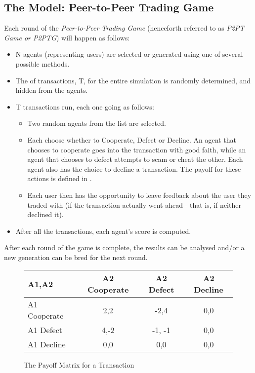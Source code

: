 \documentclass{article}
\begin{document}
\subsection{The Model: Peer-to-Peer Trading Game}
\label{sec:P2PTG}
Each round of the \emph{Peer-to-Peer Trading Game} (henceforth referred to as \emph{P2PT Game or P2PTG}) will happen as follows:
\begin{itemize}
	\item N agents (representing users) are selected or generated using one of several possible methods.
	\item The of transactions, T, for the entire simulation is randomly determined, and hidden from the agents.
	\item T transactions run, each one going as follows:
	\begin{itemize}
		\item Two random agents from the list are selected.
		\item Each choose whether to Cooperate, Defect or Decline. An agent that chooses to cooperate goes into the transaction with good faith, while an agent that chooses to defect attempts to scam or cheat the other. Each agent also has the choice to decline a transaction. The payoff for these actions is defined in .
		\item Each user then has the opportunity to leave feedback about the user they traded with (if the transaction actually went ahead - that is, if neither declined it).
	\end{itemize}
	\item After all the transactions, each agent's score is computed.
\end{itemize}

After each round of the game is complete, the results can be analysed and/or a new generation can be bred for the next round.
\begin{figure}[h]
	\begin{center}
		\label{fig:model-payoff}
		\caption{The Payoff Matrix for a Transaction}
		\begin{tabular}{| l || c | c | c |}
			\hline
			A1,A2 & A2 Cooperate & A2 Defect & A2 Decline \\ \hline
			A1 Cooperate & 2,2 & -2,4 & 0,0 \\ \hline  
			A1 Defect & 4,-2 & -1, -1 & 0,0 \\ \hline
			A1 Decline & 0,0 & 0,0 & 0,0 \\ \hline
		\end{tabular}
	\end{center}
\end{figure}
\end{document}
